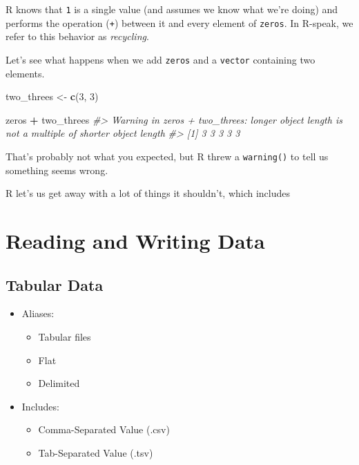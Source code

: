 \documentclass[
]{report}
\newenvironment{Shaded}{\begin{snugshade}}{\end{snugshade}}
\newcommand{\CommentTok}[1]{\textcolor[rgb]{0.56,0.35,0.01}{\textit{#1}}}
\newcommand{\DecValTok}[1]{\textcolor[rgb]{0.00,0.00,0.81}{#1}}
\newcommand{\KeywordTok}[1]{\textcolor[rgb]{0.13,0.29,0.53}{\textbf{#1}}}
\newcommand{\NormalTok}[1]{#1}
\newcommand{\OperatorTok}[1]{\textcolor[rgb]{0.81,0.36,0.00}{\textbf{#1}}}
\newcommand{\StringTok}[1]{\textcolor[rgb]{0.31,0.60,0.02}{#1}}
\providecommand{\tightlist}{%
  \setlength{\itemsep}{0pt}\setlength{\parskip}{0pt}}
\begin{document}
R knows that \texttt{1} is a single value (and assumes we know what we're doing) and performs the operation (\texttt{+}) between it and every element of \texttt{zeros}. In R-speak, we refer to this behavior as \emph{recycling}.

Let's see what happens when we add \texttt{zeros} and a \texttt{vector} containing two elements.

\begin{Shaded}
\begin{Highlighting}[]
\NormalTok{two\_threes \textless{}{-}}\StringTok{ }\KeywordTok{c}\NormalTok{(}\DecValTok{3}\NormalTok{, }\DecValTok{3}\NormalTok{)}

\NormalTok{zeros }\OperatorTok{+}\StringTok{ }\NormalTok{two\_threes}
\CommentTok{\#\textgreater{} Warning in zeros + two\_threes: longer object length is not a multiple of shorter object length}
\CommentTok{\#\textgreater{} [1] 3 3 3 3 3}
\end{Highlighting}
\end{Shaded}

That's probably not what you expected, but R threw a \texttt{warning()} to tell us something seems wrong.

R let's us get away with a lot of things it shouldn't, which includes

\cleardoublepage

\hypertarget{part-reading-and-writing-data}{%
\part{Reading and Writing Data}\label{part-reading-and-writing-data}}

\hypertarget{tabular-data}{%
\chapter{Tabular Data}\label{tabular-data}}

\begin{itemize}
\tightlist
\item
  Aliases:

  \begin{itemize}
  \tightlist
  \item
    Tabular files
  \item
    Flat
  \item
    Delimited
  \end{itemize}
\item
  Includes:

  \begin{itemize}
  \tightlist
  \item
    Comma-Separated Value (.csv)
  \item
    Tab-Separated Value (.tsv)
  \end{itemize}
\end{itemize}
\end{document}
